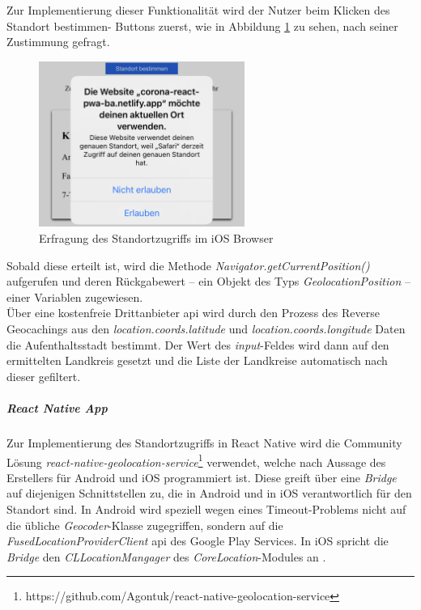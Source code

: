 Zur Implementierung dieser Funktionalität wird der Nutzer beim Klicken des \glqq Standort bestimmen\grqq{}- Buttons zuerst, wie in Abbildung \ref{fig:permission_safari} zu sehen, nach seiner Zustimmung gefragt.

\begin{figure}[h]
 \centering
 \includegraphics[width=0.6\textwidth]{figures/Permission_Safari.png}
 \caption{Erfragung des Standortzugriffs im iOS Browser}
 \label{fig:permission_safari}
\end{figure}

Sobald diese erteilt ist, wird die Methode \textit{Navigator.getCurrentPosition()} aufgerufen und deren Rückgabewert -- ein Objekt des Typs \textit{GeolocationPosition} -- einer Variablen zugewiesen.\\
Über eine kostenfreie Drittanbieter \ac{api} wird durch den Prozess des Reverse Geocachings aus den \textit{location.coords.latitude} und \textit{location.coords.longitude} Daten die Aufenthaltsstadt bestimmt.
Der Wert des \textit{input}-Feldes wird dann auf den ermittelten Landkreis gesetzt und die Liste der Landkreise automatisch nach dieser gefiltert.

\subparagraph{React Native App\\}
Zur Implementierung des Standortzugriffs in React Native wird die Community Lösung \textit{react-native-geolocation-service}\footnote{https://github.com/Agontuk/react-native-geolocation-service} verwendet, welche nach Aussage des Erstellers für Android und iOS programmiert ist.
Diese greift über eine \textit{Bridge} auf diejenigen Schnittstellen zu, die in Android und in iOS verantwortlich für den Standort sind.
In Android wird speziell wegen eines Timeout-Problems nicht auf die übliche \textit{Geocoder}-Klasse zugegriffen, sondern auf die \textit{FusedLocationProviderClient} \ac{api} des Google Play Services.
In iOS spricht die \textit{Bridge} den \textit{CLLocationMangager} des \textit{CoreLocation}-Modules an \cite{Agontuk.26.06.2021}.

